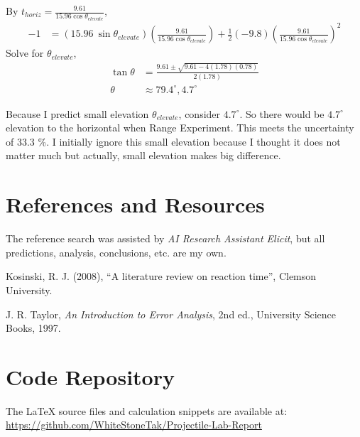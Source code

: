 \documentclass[12pt]{article}
\begin{document}
\begin{enumerate}[label=(\alph*), leftmargin=1.2cm]
    By $t_{horiz} = \frac{9.61} {15.96\cos\theta_{elevate}}$,
    \[
    \begin{aligned}
    -1 &= (15.96~\sin\theta_{elevate})\left(\frac{9.61} {15.96\cos\theta_{elevate}}\right) +\tfrac12(-9.8)\left(\frac{9.61} {15.96\cos\theta_{elevate}}\right)^2
    \end{aligned}
    \]
    \vspace{1em}
    Solve for $\theta_{elevate}$,
    \[
    \begin{aligned}
    \tan\theta&=\frac{9.61\pm\sqrt{9.61-4(1.78)(0.78)}}{2(1.78)} \\
    \theta &\approx 79.4^{\circ}, 4.7^{\circ}
    \end{aligned}
    \]

    \vspace{1em}

    Because I predict small elevation $\theta_{elevate}$, consider $4.7^{\circ}$. So there would be $4.7^{\circ}$ elevation to the horizontal when Range Experiment. This meets the uncertainty of 33.3 \%. I initially ignore this small elevation because I thought it does not matter much but actually, small elevation makes big difference.
    
  
\end{enumerate}

\newpage
\section{References and Resources}

The reference search was assisted by \emph{AI Research Assistant Elicit}, but all predictions, analysis, conclusions, etc. are my own.
\begin{thebibliography}{9}

Kosinski, R. J. (2008), ``A literature review on reaction time'', Clemson University. 

J. R. Taylor, \emph{An Introduction to Error Analysis}, 
2nd ed., University Science Books, 1997.

\end{thebibliography}


\section*{Code Repository}
\vspace{0.5em}
The LaTeX source files and calculation snippets are available at:  
\url{https://github.com/WhiteStoneTak/Projectile-Lab-Report}
\end{document}

